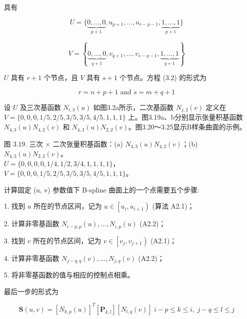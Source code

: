 \documentclass[../main.tex]{subfiles}
\begin{document}
具有

\[
U = \{ \underset{p + 1}{\underbrace{0,\ldots ,0}},{u}_{p + 1},\ldots ,{u}_{r - p - 1},\underset{p + 1}{\underbrace{1,\ldots ,1}}\}
\]

\[
V = \left\{  {\underset{q + 1}{\underbrace{0,\ldots ,0}},{v}_{q + 1},\ldots ,{v}_{s - q - 1},\underset{q + 1}{\underbrace{1,\ldots ,1}}}\right\}
\]

\(U\) 具有 \(r + 1\) 个节点，且 \(V\) 具有 \(s + 1\) 个节点。方程 (3.2) 的形式为

\[
r = n + p + 1\text{ and }s = m + q + 1 \tag{3.12}
\]

设 \(U\) 及三次基函数 \(N_{i,3}(u)\) 如图3.2a所示，二次基函数 \(N_{j,2}(v)\) 定义在 \(V=\{0,0,0,1/5,2/5,3/5,3/5,4/5,1,1,1\}\) 上。图3.19a、b分别显示张量积基函数 \(N_{4,3}(u)N_{4,2}(v)\) 和 \(N_{4,3}(u)N_{2,2}(v)\)。图3.20～3.25显示B样条曲面的示例。

\begin{center}
\begin{minipage}{18cm}
\vspace*{.6\baselineskip}
\centering
{}
\par\smallskip
图 3.19. 三次 \(\times\) 二次张量积基函数：(a) \(N_{4,3}(u)N_{4,2}(v)\)；(b) \(N_{4,3}(u)N_{2,2}(v)\)。\\ \(U=\{0,0,0,0,1/4,1/2,3/4,1,1,1,1\}\)，\\ \(V=\{0,0,0,1/5,2/5,3/5,3/5,4/5,1,1,1\}\)。
\end{minipage}
\end{center}

计算固定 (u, v) 参数值下 B-spline 曲面上的一个点需要五个步骤:

1. 找到 \(u\) 所在的节点区间，记为 \(u \in  \left\lbrack  {{u}_{i},{u}_{i + 1}}\right)\) (算法 A2.1)；

2. 计算非零基函数 \({N}_{i - p,p}\left( u\right) ,\ldots ,{N}_{i,p}\left( u\right)\) (A2.2)；

3. 找到 \(v\) 所在的节点区间，记为 \(v \in  \left\lbrack  {{v}_{j},{v}_{j + 1}}\right)\) (A2.1)；

4. 计算非零基函数 \({N}_{j - q,q}\left( v\right) ,\ldots ,{N}_{j,q}\left( v\right)\) (A2.2)；



5. 将非零基函数的值与相应的控制点相乘。

最后一步的形式为

\[
\mathbf{S}\left( {u,v}\right)  = {\left\lbrack  {N}_{k,p}\left( u\right) \right\rbrack  }^{T}\left\lbrack  {\mathbf{P}}_{k,l}\right\rbrack  \left\lbrack  {{N}_{l,q}\left( v\right) }\right\rbrack  \;i - p \leq  k \leq  i,\;j - q \leq  l \leq  j \tag{3.13}
\]
\end{document}
